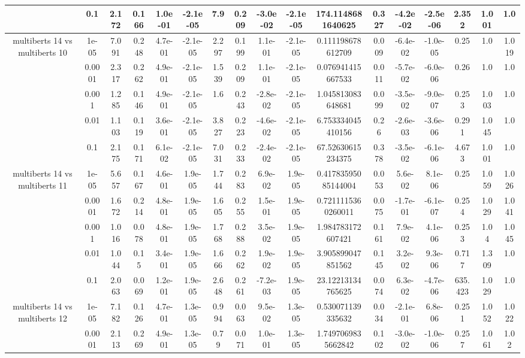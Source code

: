 \begin{tabular}{|c|c|c|c|c|c|c|c|c|c|c|c|c|c|c|c|c|}
 & 0.1 & 2.172 & 0.166 & 1.0e-01 & -2.1e-05 & 7.9 & 0.209 & -3.0e-02 & -2.1e-05 & 174.1148681640625 & 0.327 & -4.2e-02 & -2.5e-06 & 2.352 & 1.001 & 1.0 \\
\hline
\multirow{5}{*}{multiberts 14 vs multiberts 10} & 1e-05 & 7.091 & 0.248 & 4.7e-01 & -2.1e-05 & 2.297 & 0.199 & 1.1e-01 & -2.1e-05 & 0.111198678612709 & 0.009 & -6.4e-02 & -1.0e-05 & 0.25 & 1.0 & 1.019 \\
 & 0.0001 & 2.317 & 0.262 & 4.9e-01 & -2.1e-05 & 1.539 & 0.209 & 1.1e-01 & -2.1e-05 & 0.076941415667533 & 0.011 & -5.7e-02 & -6.0e-06 & 0.26 & 1.0 & 1.0 \\
 & 0.001 & 1.285 & 0.146 & 4.9e-01 & -2.1e-05 & 1.6 & 0.243 & -2.8e-02 & -2.1e-05 & 1.045813083648681 & 0.099 & -3.5e-02 & -9.0e-07 & 0.253 & 1.003 & 1.0 \\
 & 0.01 & 1.103 & 0.119 & 3.6e-01 & -2.1e-05 & 3.827 & 0.223 & -4.6e-02 & -2.1e-05 & 6.753334045410156 & 0.26 & -2.6e-03 & -3.6e-06 & 0.291 & 1.045 & 1.0 \\
 & 0.1 & 2.175 & 0.171 & 6.1e-02 & -2.1e-05 & 7.031 & 0.233 & -2.4e-02 & -2.1e-05 & 67.52630615234375 & 0.378 & -3.5e-02 & -6.1e-06 & 4.673 & 1.001 & 1.0 \\
\hline
\multirow{5}{*}{multiberts 14 vs multiberts 11} & 1e-05 & 5.657 & 0.167 & 4.6e-01 & 1.9e-05 & 1.744 & 0.283 & 6.9e-02 & 1.9e-05 & 0.41783595085144004 & 0.053 & 5.6e-02 & 8.1e-06 & 0.25 & 1.059 & 1.026 \\
 & 0.0001 & 1.672 & 0.214 & 4.8e-01 & 1.9e-05 & 1.605 & 0.255 & 1.5e-01 & 1.9e-05 & 0.7211115360260011 & 0.075 & -1.7e-01 & -6.1e-07 & 0.254 & 1.029 & 1.041 \\
 & 0.001 & 1.016 & 0.078 & 4.8e-01 & 1.9e-05 & 1.768 & 0.288 & 3.5e-02 & 1.9e-05 & 1.984783172607421 & 0.161 & 7.9e-02 & 4.1e-06 & 0.253 & 1.04 & 1.045 \\
 & 0.01 & 1.044 & 0.15 & 3.4e-01 & 1.9e-05 & 1.666 & 0.262 & 1.9e-02 & 1.9e-05 & 3.905899047851562 & 0.145 & 3.2e-02 & 9.3e-06 & 0.717 & 1.309 & 1.0 \\
 & 0.1 & 2.063 & 0.069 & 1.2e-01 & 1.9e-05 & 2.648 & 0.261 & -7.2e-03 & 1.9e-05 & 23.12213134765625 & 0.074 & 6.3e-02 & -4.7e-06 & 635.423 & 1.029 & 1.0 \\
\hline
\multirow{5}{*}{multiberts 14 vs multiberts 12} & 1e-05 & 7.182 & 0.126 & 4.7e-01 & 1.3e-05 & 0.994 & 0.063 & 9.5e-02 & 1.3e-05 & 0.530071139335632 & 0.034 & -2.1e-01 & 6.8e-06 & 0.251 & 1.052 & 1.022 \\
 & 0.0001 & 2.113 & 0.269 & 4.9e-01 & 1.3e-05 & 0.79 & 0.071 & 1.0e-01 & 1.3e-05 & 1.7497069835662842 & 0.102 & -3.0e-02 & -1.0e-06 & 0.257 & 1.061 & 1.02 \\

\end{tabular}

